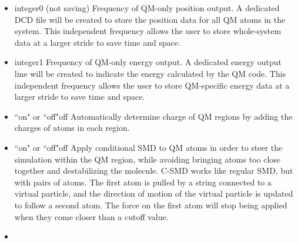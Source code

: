 \begin{itemize}
\item
{}%
{integer}{0 (not saving)}{%
Frequency of QM-only position output. A dedicated DCD file will be
created to store the position data for all QM atoms in the system.
This independent frequency allows the user to store whole-system
data at a larger stride to save time and space.
}

\item
{}%
{integer}{1}{%
Frequency of QM-only energy output. A dedicated energy output line will be 
created to indicate the energy calculated by the QM code.
This independent frequency allows the user to store QM-specific energy 
data at a larger stride to save time and space.
}

\item
{}%
{``on" or ``off"}{off}{%
Automatically determine charge of QM regions by adding the charges of 
atoms in each region.
}

\item
{}%
{``on" or ``off"}{off}{%
Apply conditional SMD to QM atoms in order to steer the simulation 
within the QM region, while avoiding bringing atoms too close together 
and destabilizing the molecule. C-SMD works like regular SMD, but 
with pairs of atoms. The first atom is pulled by a string connected 
to a virtual particle, and the direction of motion of the virtual 
particle is updated to follow a second atom. The force on the first 
atom will stop being applied when they come closer than a cutoff value.
}

\item
{}

\end{itemize}


